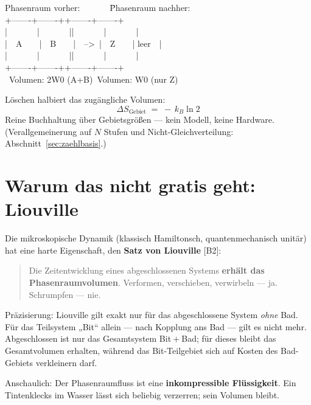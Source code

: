 \begin{center}
\begin{minipage}{0.75\textwidth}
\ttfamily\small
\begin{tabbing}
Phasenraum vorher:\ \ \ \ \ \ \ \=Phasenraum nachher:\\[0.3em]
+-------+-------+\>+-------+-------+\\
|\ \ \ \ \ \ \ |\ \ \ \ \ \ \ |\>|\ \ \ \ \ \ \ |\ \ \ \ \ \ \ |\\
|\ \ A\ \ \ \ |\ \ B\ \ \ \ |\ \ -->\ \>|\ \ Z\ \ \ \ | leer\ \ |\\
|\ \ \ \ \ \ \ |\ \ \ \ \ \ \ |\>|\ \ \ \ \ \ \ |\ \ \ \ \ \ \ |\\
+-------+-------+\>+-------+-------+\\
\ Volumen: 2W0 (A+B)\>\ Volumen: W0 (nur Z)
\end{tabbing}
\end{minipage}
\end{center}

\LB Löschen halbiert das zugängliche Volumen:
\[
  \Delta S_{\text{Gebiet}} \;=\; -\,k_B \ln 2
\]
Reine Buchhaltung über Gebietsgrößen --- kein Modell, keine Hardware.
(Verallgemeinerung auf $N$ Stufen und Nicht-Gleichverteilung:
Abschnitt~\ref{sec:zaehlbasis}.)

\section{Warum das nicht gratis geht: Liouville}
\label{sec:liouville}

Die mikroskopische Dynamik (klassisch Hamiltonsch, quantenmechanisch unitär) hat
eine harte Eigenschaft, den \textbf{Satz von Liouville} [B2]:

\begin{quote}
\LB Die Zeitentwicklung eines abgeschlossenen Systems \textbf{erhält das
Phasenraumvolumen}. Verformen, verschieben, verwirbeln --- ja. Schrumpfen --- nie.
\end{quote}

Präzisierung: Liouville gilt exakt nur für das abgeschlossene System \emph{ohne}
Bad. Für das Teilsystem „Bit“ allein --- nach Kopplung ans Bad --- gilt es nicht
mehr. Abgeschlossen ist nur das Gesamtsystem Bit${}+{}$Bad; für dieses bleibt das
Gesamtvolumen erhalten, während das Bit-Teilgebiet sich auf Kosten des Bad-Gebiets
verkleinern darf.

Anschaulich: Der Phasenraumfluss ist eine \textbf{inkompressible Flüssigkeit}. Ein
Tintenklecks im Wasser lässt sich beliebig verzerren; sein Volumen bleibt.

